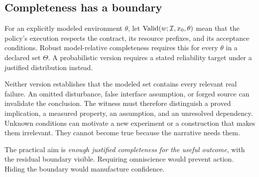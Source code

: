 \subsection{Completeness has a boundary}

For an explicitly modeled environment $\theta$, let $\operatorname{Valid}(w;\mathcal{I},x_0,\theta)$ mean that the policy's execution respects the contract, its resource prefixes, and its acceptance conditions. Robust model-relative completeness requires this for every $\theta$ in a declared set $\Theta$. A probabilistic version requires a stated reliability target under a justified distribution instead.

Neither version establishes that the modeled set contains every relevant real failure. An omitted disturbance, false interface assumption, or forged source can invalidate the conclusion. The witness must therefore distinguish a proved implication, a measured property, an assumption, and an unresolved dependency. Unknown conditions can motivate a new experiment or a construction that makes them irrelevant. They cannot become true because the narrative needs them.

The practical aim is \emph{enough justified completeness for the useful outcome}, with the residual boundary visible. Requiring omniscience would prevent action. Hiding the boundary would manufacture confidence.
